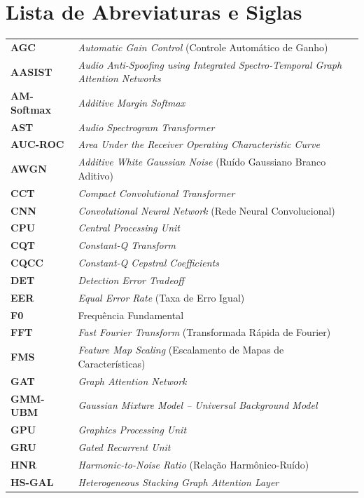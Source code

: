 \documentclass[12pt,a4paper]{article}
\begin{document}
\newpage

\listoffigures
\newpage
\listoftables
\newpage

\section*{Lista de Abreviaturas e Siglas}
\begin{singlespace}
\begin{tabular}{p{2.5cm}p{12cm}}
\textbf{AGC}     & \textit{Automatic Gain Control} (Controle Automático de Ganho) \\
\textbf{AASIST}  & \textit{Audio Anti-Spoofing using Integrated Spectro-Temporal Graph Attention Networks} \\
\textbf{AM-Softmax} & \textit{Additive Margin Softmax} \\
\textbf{AST}     & \textit{Audio Spectrogram Transformer} \\
\textbf{AUC-ROC} & \textit{Area Under the Receiver Operating Characteristic Curve} \\
\textbf{AWGN}    & \textit{Additive White Gaussian Noise} (Ruído Gaussiano Branco Aditivo) \\
\textbf{CCT}     & \textit{Compact Convolutional Transformer} \\
\textbf{CNN}     & \textit{Convolutional Neural Network} (Rede Neural Convolucional) \\
\textbf{CPU}     & \textit{Central Processing Unit} \\
\textbf{CQT}     & \textit{Constant-Q Transform} \\
\textbf{CQCC}    & \textit{Constant-Q Cepstral Coefficients} \\
\textbf{DET}     & \textit{Detection Error Tradeoff} \\
\textbf{EER}     & \textit{Equal Error Rate} (Taxa de Erro Igual) \\
\textbf{F0}      & Frequência Fundamental \\
\textbf{FFT}     & \textit{Fast Fourier Transform} (Transformada Rápida de Fourier) \\
\textbf{FMS}     & \textit{Feature Map Scaling} (Escalamento de Mapas de Características) \\
\textbf{GAT}     & \textit{Graph Attention Network} \\
\textbf{GMM-UBM} & \textit{Gaussian Mixture Model -- Universal Background Model} \\
\textbf{GPU}     & \textit{Graphics Processing Unit} \\
\textbf{GRU}     & \textit{Gated Recurrent Unit} \\
\textbf{HNR}     & \textit{Harmonic-to-Noise Ratio} (Relação Harmônico-Ruído) \\
\textbf{HS-GAL}  & \textit{Heterogeneous Stacking Graph Attention Layer} \\
\end{tabular}


\end{singlespace}
\end{document}
